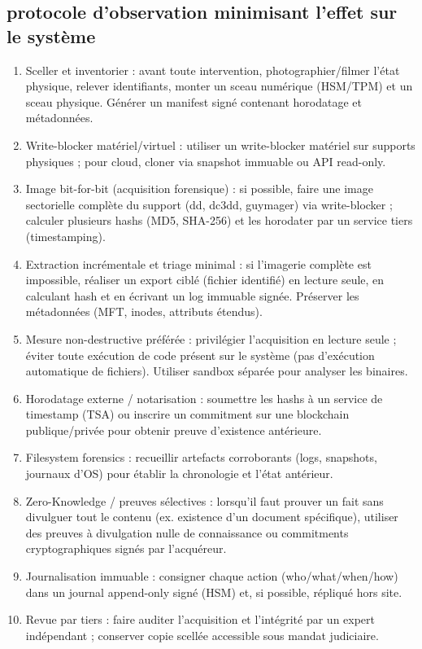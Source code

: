 \documentclass[12pt,a4paper]{article}
\begin{document}
	 \subsection{protocole d'observation minimisant l'effet sur le système}
	 \begin{enumerate}
	 	
	 \item Sceller et inventorier : avant toute intervention, photographier/filmer l’état physique, relever identifiants, monter un sceau numérique (HSM/TPM) et un sceau physique. Générer un manifest signé contenant horodatage et métadonnées.
	 
	 \item Write-blocker matériel/virtuel : utiliser un write-blocker matériel sur supports physiques ; pour cloud, cloner via snapshot immuable ou API read-only.
	 
	 \item Image bit-for-bit (acquisition forensique) : si possible, faire une image sectorielle complète du support (dd, dc3dd, guymager) via write-blocker ; calculer plusieurs hashs (MD5, SHA-256) et les horodater par un service tiers (timestamping).
	 \item Extraction incrémentale et triage minimal : si l’imagerie complète est impossible, réaliser un export ciblé (fichier identifié) en lecture seule, en calculant hash et en écrivant un log immuable signée. Préserver les métadonnées (MFT, inodes, attributs étendus).
	 \item Mesure non-destructive préférée : privilégier l’acquisition en lecture seule ; éviter toute exécution de code présent sur le système (pas d’exécution automatique de fichiers). Utiliser sandbox séparée pour analyser les binaires.
	 

	 \item Horodatage externe / notarisation : soumettre les hashs à un service de timestamp (TSA) ou inscrire un commitment sur une blockchain publique/privée pour obtenir preuve d’existence antérieure.
	 \item Filesystem forensics : recueillir artefacts corroborants (logs, snapshots, journaux d’OS) pour établir la chronologie et l’état antérieur.
	 \item Zero-Knowledge / preuves sélectives : lorsqu’il faut prouver un fait sans divulguer tout le contenu (ex. existence d’un document spécifique), utiliser des preuves à divulgation nulle de connaissance ou commitments cryptographiques signés par l’acquéreur.
	 
	 \item Journalisation immuable : consigner chaque action (who/what/when/how) dans un journal append-only signé (HSM) et, si possible, répliqué hors site.
	 \item Revue par tiers : faire auditer l’acquisition et l’intégrité par un expert indépendant ; conserver copie scellée accessible sous mandat judiciaire.


\end{enumerate}
\end{document}
